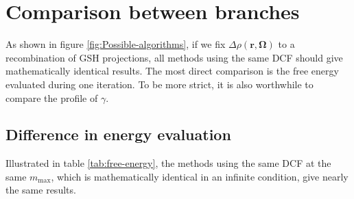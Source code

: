 \section{Comparison between branches}

As shown in figure \ref{fig:Possible-algorithms}, if we fix $\Delta\rho(\mathbf{r},\mathbf{\Omega})$
to a recombination of \acs{GSH} projections, all methods using the
same \acs{DCF} should give mathematically identical results. The
most direct comparison is the free energy evaluated during one iteration.
To be more strict, it is also worthwhile to compare the profile
of $\gamma$.

\subsection{Difference in energy evaluation}

Illustrated in table \ref{tab:free-energy}, the methods using the same
\acs{DCF} at the same $m_{\max}$, which is mathematically identical
in an infinite condition, give nearly the same results.

